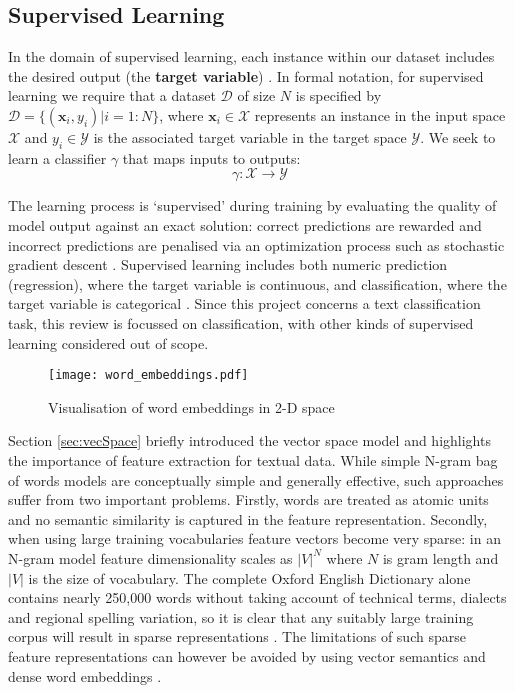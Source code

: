 \documentclass[Dissertation.tex]{subfiles}
\begin{document}
\subsection{Supervised Learning}
In the domain of supervised learning, each instance within our dataset includes the desired output (the \textbf{target variable}) \cite{geronHandsonMachineLearning2017}. In formal notation, for supervised learning we require that a dataset $ \mathcal{D}$ of size $N$ is specified by $ \mathcal{D} = \{(\mathbf{x}_i, y_i) | i = 1:N\}$, where $ \mathbf{x}_i \in \mathcal{X} $ represents an instance in the input space $ \mathcal{X} $ and $ y_i \in \mathcal{Y}$ is the associated target variable in the target space $ \mathcal{Y} $. We seek to learn a classifier $ \gamma $ that maps inputs to outputs:
$$ \gamma: \mathcal{X}\rightarrow\mathcal{Y}$$ 

The learning process is `supervised' during training by evaluating the quality of model output against an exact solution: correct predictions are rewarded and incorrect predictions are penalised via an optimization process such as stochastic gradient descent \cite{mendelsonAdvancedLecturesMachine2003}. Supervised learning includes both numeric prediction (regression), where the target variable is continuous, and classification, where the target variable is categorical \cite{wittenDataMiningPractical2011}. Since this project concerns a text classification task, this review is focussed on classification, with other kinds of supervised learning considered out of scope. 


\begin{figure}[h]
	\centering
	\texttt{[image: word\_embeddings.pdf]}
	\caption{Visualisation of word embeddings in 2-D
		\label{fig:wordEmbeds} space}
\end{figure}

Section \ref{sec:vecSpace} briefly introduced the vector space model and highlights the importance of feature extraction for textual data. While simple N-gram bag of words models are conceptually simple and generally effective, such approaches suffer from two important problems. Firstly, words are treated as atomic units and no semantic similarity is captured in the feature representation. Secondly, when using large training vocabularies feature vectors become very sparse: in an N-gram model feature dimensionality scales as $ |V|^N $ where $ N $ is gram length and $ |V|  $ is the size of vocabulary.  The complete Oxford English Dictionary alone contains nearly 250,000 words \cite{HowManyWords} without taking account of technical terms, dialects and regional spelling variation, so it is clear that any suitably large training corpus will result in sparse representations \cite{jurafskySpeechLanguageProcessing}. The limitations of such sparse feature representations can however be avoided by using vector semantics and dense word embeddings \cite{jurafskySpeechLanguageProcessing}.
\end{document}

